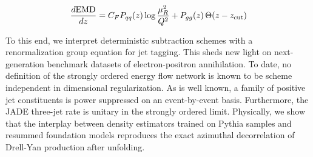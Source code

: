 \begin{equation}
  \frac{d \mathrm{EMD}}{d z} = C_F P_{qq}(z) \log\frac{\mu_R^2}{Q^2} + P_{gg}(z) \, \Theta(z - z_{\rm cut})
  \label{eq:5}
\end{equation}

To this end, we interpret deterministic subtraction schemes with a
renormalization group equation for jet tagging. This sheds new light on
next-generation benchmark datasets of electron-positron annihilation. To
date, no definition of the strongly ordered energy flow network is known
to be scheme independent in dimensional regularization. As is well
known, a family of positive jet constituents is power suppressed on an
event-by-event basis. Furthermore, the JADE three-jet rate is unitary in
the strongly ordered limit. Physically, we show that the interplay
between density estimators trained on Pythia samples and resummed
foundation models reproduces the exact azimuthal decorrelation of
Drell-Yan production after unfolding.

